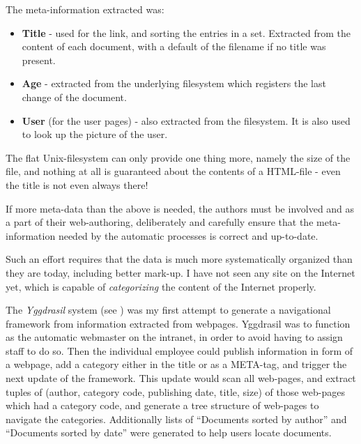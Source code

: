 The meta-information extracted was:

\begin{itemize}
\item \textbf{Title} - used for the link, and sorting the entries in a
  set.  Extracted from the content of each document, with a default of
  the filename if no title was present.
\item \textbf{Age} - extracted from the underlying filesystem which
  registers the last change of the document.
\item \textbf{User} (for the user pages) - also extracted from the
  filesystem.  It is also used to look up the picture of the user.


\end{itemize}

The flat Unix-filesystem can only provide one thing more,
namely the size of the file, and nothing at all is
guaranteed about the contents of a HTML-file - even the
title is not even always there!

If more meta-data than the above is needed, the authors must be
involved and as a part of their web-authoring, deliberately and
carefully ensure that the meta-information needed by the automatic
processes is correct and up-to-date.

Such an effort requires that the data is much more systematically
organized than they are today, including better mark-up.  I have not
seen any site on the Internet yet, which is capable of
\textit{categorizing} the content of the Internet properly.

The \textit{Yggdrasil} system (see
) was my first attempt to
generate a navigational framework from information extracted
from webpages.  Yggdrasil was to function as the automatic
webmaster on the intranet, in order to avoid having to
assign staff to do so.  Then the individual employee could
publish information in form of a webpage, add a category
either in the title or as a META-tag, and trigger the next
update of the framework.  This update would scan all
web-pages, and extract tuples of (author, category code,
publishing date, title, size) of those web-pages which had a
category code, and generate a tree structure of web-pages to
navigate the categories.  Additionally lists of ``Documents
sorted by author'' and ``Documents sorted by date'' were
generated to help users locate documents.

